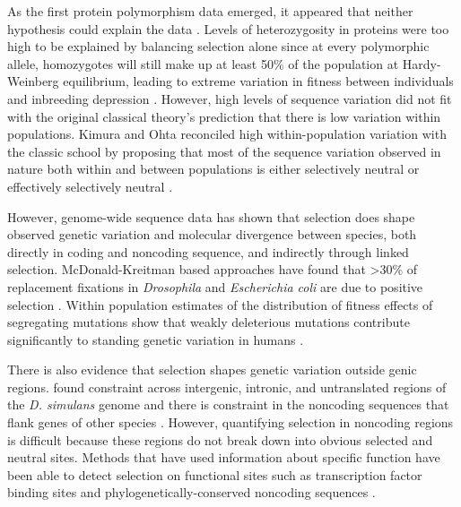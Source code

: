As the first protein polymorphism  data emerged, it appeared that neither hypothesis could explain the data \citep{Lewontin1966-kz,Harris1966-lm}. Levels of heterozygosity in proteins were too high to be explained by balancing selection alone since at every polymorphic allele, homozygotes will still make up at least 50\% of the population at Hardy-Weinberg equilibrium, leading to extreme variation in fitness between individuals and inbreeding depression \citep{lewontin1974}. However, high levels of sequence variation did not fit with the original classical theory’s prediction that there is low variation within populations. Kimura and Ohta reconciled high within-population variation with the classic school by proposing that most of the sequence variation observed in nature both within and between populations is either selectively neutral or effectively selectively neutral \citep{Kimura1968-cl,Mootoo_Kimura1971-dc,Kimura_undated-by,Ohta1973-qx}.

However, genome-wide sequence data has shown that selection does shape observed genetic variation and molecular divergence between species, both directly in coding and noncoding sequence, and indirectly through linked selection. McDonald-Kreitman based approaches have found that \textgreater 30\% of replacement fixations in \textit{Drosophila} and \textit{Escherichia coli} are due to positive selection \citep{Eyre-Walker2006-jg,Fay2002-au,Begun2007-gh}. Within population estimates of the distribution of fitness effects of segregating mutations show that weakly deleterious mutations contribute significantly to standing genetic variation in humans \citep{Williamson2005-ja,Eyre-Walker2006-tr}. 

There is also evidence that selection shapes genetic variation outside genic regions. \citet{Begun2007-gh} found constraint across intergenic, intronic, and untranslated regions of the \textit{D. simulans} genome and there is constraint in the noncoding sequences that flank genes of other species \citep{Eory2010-ja}. However, quantifying selection in noncoding regions is difficult because these regions do not break down into obvious selected and neutral sites. Methods that have used information about specific function have been able to detect selection on functional sites such as transcription factor binding sites \citep{Arbiza2013-te} and phylogenetically-conserved noncoding sequences \citep{Halligan2013-pz}. 

